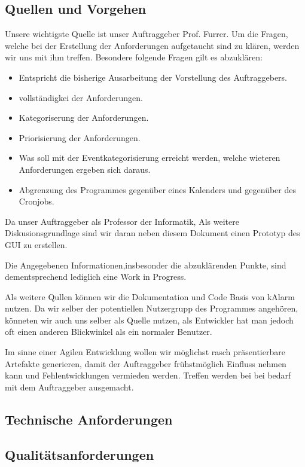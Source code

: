 \documentclass[11pt,titelpage]{scrreprt}
\begin{document}
\subsection{Quellen und Vorgehen}
Unsere wichtigste Quelle ist unser Auftraggeber Prof. Furrer. Um die Fragen, welche bei der Erstellung der Anforderungen aufgetaucht sind zu klären, werden wir uns mit ihm treffen.
Besondere folgende Fragen gilt es abzuklären:

\begin{itemize}
\item Entspricht die bisherige Ausarbeitung der Vorstellung des Auftraggebers.
\item vollständigkei der Anforderungen.
\item Kategoriserung der Anforderungen.
\item Priorisierung der Anforderungen.
\item Was soll mit der Eventkategorisierung erreicht werden, welche wieteren Anforderungen ergeben sich daraus.
\item Abgrenzung des Programmes gegenüber eines Kalenders und gegenüber des Cronjobs.
\end{itemize}
Da unser Auftraggeber als Professor der Informatik, 
Als weitere Diskusionsgrundlage sind wir daran neben diesem Dokument einen Prototyp des GUI zu erstellen.


Die Angegebenen Informationen,insbesonder die abzuklärenden Punkte, sind dementsprechend lediglich eine Work in Progress.


Als weitere Qullen können wir die Dokumentation und Code Basis von kAlarm nutzen. 
Da wir selber der potentiellen Nutzergrupp des Programmes angehören, könneten wir auch uns selber als Quelle nutzen, als Entwickler hat man jedoch oft einen anderen Blickwinkel als ein normaler Benutzer.


Im sinne einer Agilen Entwicklung wollen wir möglichst rasch präsentierbare Artefakte generieren, damit der Auftraggeber frühstmöglich Einfluss nehmen kann und Fehlentwicklungen vermieden werden. Treffen werden bei bei bedarf mit dem Auftraggeber ausgemacht.


\subsection{Technische Anforderungen}
\subsection{Qualitätsanforderungen}
\end{document}
